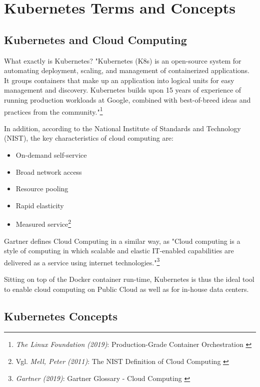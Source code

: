 %
%

\pagebreak
\section{Kubernetes Terms and Concepts}

\onehalfspacing

\subsection{Kubernetes and Cloud Computing}

What exactly is Kubernetes? "Kubernetes (K8s) is an open-source system for automating deployment, scaling, and management of containerized applications.
It groups containers that make up an application into logical units for easy management and discovery. Kubernetes builds upon 15 years of experience of running production workloads at Google, combined with best-of-breed ideas and practices from the community."\footnote{\textit{The Linux Foundation (2019)}: Production-Grade Container Orchestration \cite{kubernetes}}

In addition, according to the National Institute of Standards and Technology (NIST), the key characteristics of cloud computing are: 
\begin{itemize}
\item On-demand self-service
\item Broad network access
\item Resource pooling
\item Rapid elasticity
\item Measured service\footnote{Vgl. \textit{Mell, Peter (2011)}: The NIST Definition of Cloud Computing \cite{sp800-145}}
\end{itemize}

Gartner defines Cloud Computing in a similar way, as "Cloud computing is a style of computing in which scalable and elastic IT-enabled capabilities are delivered as a service using internet technologies."\footnote{\textit{Gartner (2019)}: Gartner Glossary - Cloud Computing \cite{gartnerGlossary}}

Sitting on top of the Docker container run-time, Kubernetes is thus the ideal tool to enable cloud computing on Public Cloud as well as for in-house data centers.

\subsection{Kubernetes Concepts}

